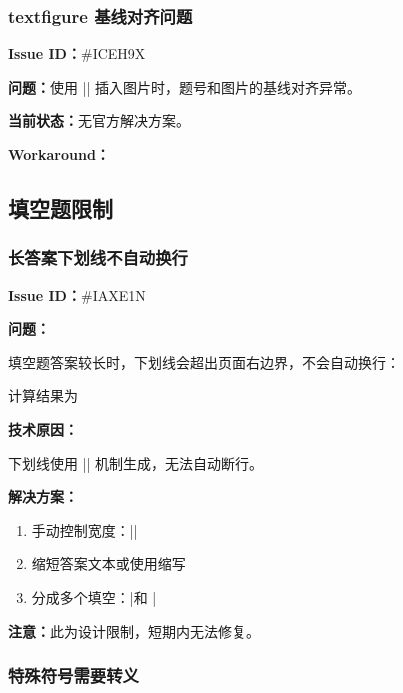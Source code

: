 \subsubsection{textfigure 基线对齐问题}

\textbf{Issue ID：}\#ICEH9X

\textbf{问题：}使用 |\textfigure| 插入图片时，题号和图片的基线对齐异常。

\textbf{当前状态：}无官方解决方案。

\textbf{Workaround：}

\begin{latexcode}
\end{latexcode}


\subsection{填空题限制}

\subsubsection{长答案下划线不自动换行}

\textbf{Issue ID：}\#IAXE1N

\textbf{问题：}

填空题答案较长时，下划线会超出页面右边界，不会自动换行：

\begin{latexcode}
  计算结果为 
\end{latexcode}

\textbf{技术原因：}

下划线使用 |\leaders| 机制生成，无法自动断行。

\textbf{解决方案：}

\begin{enumerate}
  \item 手动控制宽度：|\fillin[width = 8em][答案]|
  \item 缩短答案文本或使用缩写
  \item 分成多个填空：|\fillin[答案1] 和 \fillin[答案2]|
\end{enumerate}

\textbf{注意：}此为设计限制，短期内无法修复。

\subsubsection{特殊符号需要转义}


